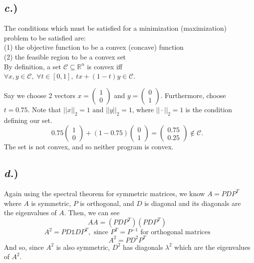 \documentclass{report}
\newcommand{\tab}{\-\hspace{1.5cm}}
\begin{document}
\subsection*{\textit{c.})}

The conditions which must be satisfied for a minimization (maximization) problem to be satisfied are:\\
\tab (1) the objective function to be a convex (concave) function\\
\tab (2) the feasible region to be a convex set\\

By definition, a set $\mathcal{C} \subseteq \mathbb{R}^n$ is convex iff $\forall x,y \in \mathcal{C},\; \forall t \in [0,1],\; tx + (1-t)y \in \mathcal{C}$.

Say we choose 2 vectors $x = \begin{pmatrix} 1 \\ 0 \end{pmatrix}$ and $y = \begin{pmatrix} 0 \\ 1 \end{pmatrix}$. Furthermore, choose $t = 0.75$. Note that $||x||_2 = 1 \text{ and } ||y||_2 = 1$, where $||\cdot||_2 = 1$ is the condition defining our set.
$$0.75\begin{pmatrix} 1 \\ 0 \end{pmatrix} + (1-0.75)\begin{pmatrix} 0 \\ 1 \end{pmatrix} = \begin{pmatrix} 0.75 \\ 0.25 \end{pmatrix} \notin \mathcal{C}.$$
The set is not convex, and so neither program is convex.


\subsection*{\textit{d.})}

Again using the spectral theorem for symmetric matrices, we know $ A = PDP^T$ where $A$ is symmetric, $P$ is orthogonal, and $D$ is diagonal and its diagonals are the eigenvalues of $A$. Then, we can see
$$ AA = (PDP^T)(PDP^T) $$
$$ A^2 = PD\mathbb{1}DP^T, \text{ since } P^T = P^{-1}\text{ for orthogonal matrices} $$
$$ A^2 = PD^2P^T $$
And so, since $A^2$ is also symmetric, $D^2$ has diagonals $\lambda^2$ which are the eigenvalues of $A^2$.
\end{document}
